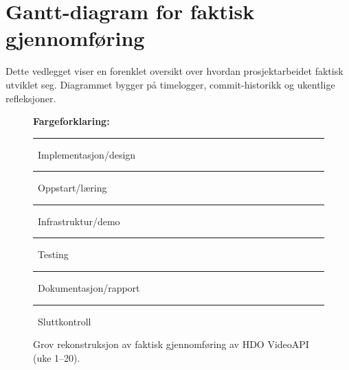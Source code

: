 \chapter{Gantt-diagram for faktisk gjennomføring}
\label{app:gantt}

Dette vedlegget viser en forenklet oversikt over hvordan prosjektarbeidet faktisk utviklet seg. Diagrammet bygger på timelogger, commit-historikk og ukentlige refleksjoner.

\begin{figure}[H]
\centering


\vspace{0.2em}
{\tiny
\textbf{Fargeforklaring:}\;
\textcolor{red!40}{\rule{0.45cm}{0.13cm}}~Implementasjon/design \;
\textcolor{blue!30}{\rule{0.45cm}{0.13cm}}~Oppstart/læring \;
\textcolor{green!30}{\rule{0.45cm}{0.13cm}}~Infrastruktur/demo \;
\textcolor{orange!30}{\rule{0.45cm}{0.13cm}}~Testing \;
\textcolor{purple!30}{\rule{0.45cm}{0.13cm}}~Dokumentasjon/rapport \;
\textcolor{yellow!30}{\rule{0.45cm}{0.13cm}}~Sluttkontroll
}

\caption{Grov rekonstruksjon av faktisk gjennomføring av HDO VideoAPI (uke 1--20).}
\label{fig:gantt-faktisk}
\end{figure}